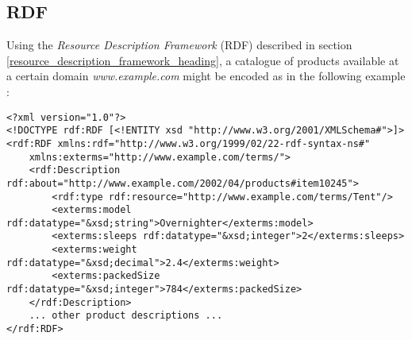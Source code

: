 %
%
%
%
%
%
%

\subsection{RDF}
\label{rdf_heading}

Using the \emph{Resource Description Framework} (RDF) described in section
\ref{resource_description_framework_heading}, a catalogue of products available
at a certain domain \emph{www.example.com} might be encoded as in the following
example \cite{rdfprimer}:

\begin{scriptsize}
    \begin{verbatim}
<?xml version="1.0"?>
<!DOCTYPE rdf:RDF [<!ENTITY xsd "http://www.w3.org/2001/XMLSchema#">]>
<rdf:RDF xmlns:rdf="http://www.w3.org/1999/02/22-rdf-syntax-ns#"
    xmlns:exterms="http://www.example.com/terms/">
    <rdf:Description rdf:about="http://www.example.com/2002/04/products#item10245">
        <rdf:type rdf:resource="http://www.example.com/terms/Tent"/>
        <exterms:model rdf:datatype="&xsd;string">Overnighter</exterms:model>
        <exterms:sleeps rdf:datatype="&xsd;integer">2</exterms:sleeps>
        <exterms:weight rdf:datatype="&xsd;decimal">2.4</exterms:weight>
        <exterms:packedSize rdf:datatype="&xsd;integer">784</exterms:packedSize>
    </rdf:Description>
    ... other product descriptions ...
</rdf:RDF>
    \end{verbatim}
\end{scriptsize}

